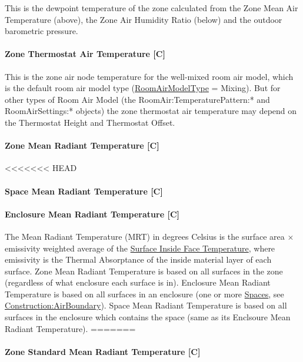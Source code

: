 This is the dewpoint temperature of the zone calculated from the Zone Mean Air Temperature (above), the Zone Air Humidity Ratio (below) and the outdoor barometric pressure.

\paragraph{Zone Thermostat Air Temperature {[}C{]}}\label{zone-thermostat-air-temperature-c}

This is the zone air node temperature for the well-mixed room air model, which is the default room air model type (\hyperref[roomairmodeltype]{RoomAirModelType} = Mixing). But for other types of Room Air Model (the RoomAir:TemperaturePattern:* and RoomAirSettings:* objects) the zone thermostat air temperature may depend on the Thermostat Height and Thermostat Offset.

\paragraph{Zone Mean Radiant Temperature {[}C{]}}\label{zone-mean-radiant-temperature-c}
<<<<<<< HEAD
\paragraph{Space Mean Radiant Temperature {[}C{]}}\label{space-mean-radiant-temperature-c}
\paragraph{Enclosure Mean Radiant Temperature {[}C{]}}\label{enclosure-mean-radiant-temperature-c}

The Mean Radiant Temperature (MRT) in degrees Celsius is the surface area $\times$ emissivity weighted average of the \hyperref[surface-inside-face-temperature-c]{Surface Inside Face Temperature}, where emissivity is the Thermal Absorptance of the inside material layer of each surface. Zone Mean Radiant Temperature is based on all surfaces in the zone (regardless of what enclosure each surface is in). Enclosure Mean Radiant Temperature is based on all surfaces in an enclosure (one or more \hyperref[space]{Spaces}, see \hyperref[constructionairboundary]{Construction:AirBoundary}). Space Mean Radiant Temperature is based on all surfaces in the enclosure which contains the space (same as its Enclsoure Mean Radiant Temperature).
=======
\paragraph{Zone Standard Mean Radiant Temperature {[}C{]}}\label{zone-standard-mean-radiant-temperature-c}
